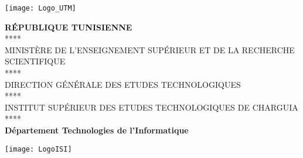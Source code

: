 


\thispagestyle{cover}%
\hspace{-47pt}
\begin{minipage}[l]{0.2\columnwidth}
\vspace{6mm}
\texttt{[image: Logo\_UTM]}\\
\end{minipage}
\hfill
\begin{minipage}[l]{0.6\columnwidth}
\centering
\footnotesize

\textbf{{\small RÉPUBLIQUE TUNISIENNE }}\\[-0.3cm]
\small ***** \\[-0.3cm]
\small MINISTÈRE DE L'ENSEIGNEMENT SUPÉRIEUR ET DE LA RECHERCHE SCIENTIFIQUE \\[-0.3cm]
\small ***** \\[-0.3cm]
\small DIRECTION GÉNÉRALE DES ETUDES TECHNOLOGIQUES \\[-0.3cm]
\small ***** \\[-0.3cm]
\small INSTITUT SUPÉRIEUR DES ETUDES TECHNOLOGIQUES DE CHARGUIA\\[-0.3cm]
\small ***** \\[-0.3cm]
\textbf{{\small Département Technologies de l'Informatique }}\\[-0.3cm]
\end{minipage}
\hfill
\begin{minipage}[l]{0.02\columnwidth}
\end{minipage}
\hfill
\begin{minipage}[l]{0.18\columnwidth}
\vspace{6mm}
\texttt{[image:  LogoISI]}\\
\end{minipage}
\vskip1.5cm

